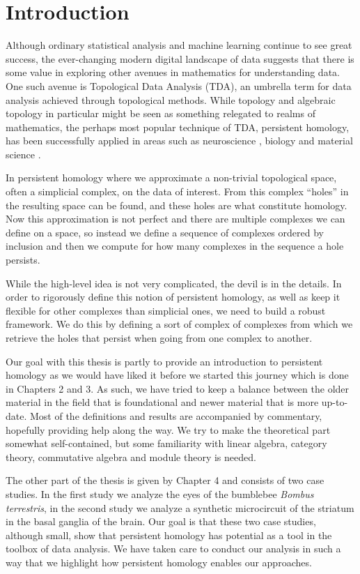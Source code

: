 \chapter{Introduction}
Although ordinary statistical analysis and machine learning continue to see great success, the ever-changing modern digital landscape of data suggests that there is some value in exploring other avenues in mathematics for understanding data. One such avenue is Topological Data Analysis (TDA), an umbrella term for data analysis achieved through topological methods. While topology and algebraic topology in particular might be seen as something relegated to realms of mathematics, the perhaps most popular technique of TDA, persistent homology, has been successfully applied in areas such as neuroscience \cite{reimann}, biology \cite{plants} and material science \cite{moon2019}.

In persistent homology where we approximate a non-trivial topological space, often a simplicial complex, on the data of interest. From this complex ``holes'' in the resulting space can be found, and these holes are what constitute homology. Now this approximation is not perfect and there are multiple complexes we can define on a space, so instead we define a sequence of complexes ordered by inclusion and then we compute for how many complexes in the sequence a hole persists.

While the high-level idea is not very complicated, the devil is in the details. In order to rigorously define this notion of persistent homology, as well as keep it flexible for other complexes than simplicial ones, we need to build a robust framework. We do this by defining a sort of complex of complexes from which we retrieve the holes that persist when going from one complex to another.

Our goal with this thesis is partly to provide an introduction to persistent homology as we would have liked it before we started this journey which is done in Chapters 2 and 3. As such, we have tried to keep a balance between the older material in the field that is foundational and newer material that is more up-to-date. Most of the definitions and results are accompanied by commentary, hopefully providing help along the way. We try to make the theoretical part somewhat self-contained, but some familiarity with linear algebra, category theory, commutative algebra and module theory is needed.

The other part of the thesis is given by Chapter 4 and consists of two case studies. In the first study we analyze the eyes of the bumblebee \textit{Bombus terrestris}, in the second study we analyze a synthetic microcircuit of the striatum in the basal ganglia of the brain. Our goal is that these two case studies, although small, show that persistent homology has potential as a tool in the toolbox of data analysis. We have taken care to conduct our analysis in such a way that we highlight how persistent homology enables our approaches.

